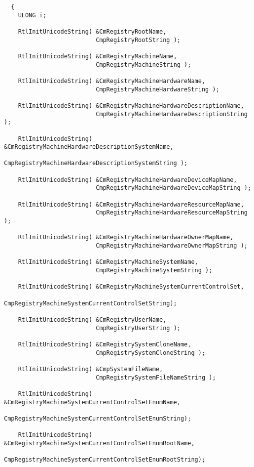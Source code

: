 \begin{listing}
  \begin{verbatim}
  {
    ULONG i;

    RtlInitUnicodeString( &CmRegistryRootName,
                          CmpRegistryRootString );

    RtlInitUnicodeString( &CmRegistryMachineName,
                          CmpRegistryMachineString );

    RtlInitUnicodeString( &CmRegistryMachineHardwareName,
                          CmpRegistryMachineHardwareString );

    RtlInitUnicodeString( &CmRegistryMachineHardwareDescriptionName,
                          CmpRegistryMachineHardwareDescriptionString );

    RtlInitUnicodeString( &CmRegistryMachineHardwareDescriptionSystemName,
                          CmpRegistryMachineHardwareDescriptionSystemString );

    RtlInitUnicodeString( &CmRegistryMachineHardwareDeviceMapName,
                          CmpRegistryMachineHardwareDeviceMapString );

    RtlInitUnicodeString( &CmRegistryMachineHardwareResourceMapName,
                          CmpRegistryMachineHardwareResourceMapString );

    RtlInitUnicodeString( &CmRegistryMachineHardwareOwnerMapName,
                          CmpRegistryMachineHardwareOwnerMapString );

    RtlInitUnicodeString( &CmRegistryMachineSystemName,
                          CmpRegistryMachineSystemString );

    RtlInitUnicodeString( &CmRegistryMachineSystemCurrentControlSet,
                          CmpRegistryMachineSystemCurrentControlSetString);

    RtlInitUnicodeString( &CmRegistryUserName,
                          CmpRegistryUserString );

    RtlInitUnicodeString( &CmRegistrySystemCloneName,
                          CmpRegistrySystemCloneString );

    RtlInitUnicodeString( &CmpSystemFileName,
                          CmpRegistrySystemFileNameString );

    RtlInitUnicodeString( &CmRegistryMachineSystemCurrentControlSetEnumName,
                          CmpRegistryMachineSystemCurrentControlSetEnumString);

    RtlInitUnicodeString( &CmRegistryMachineSystemCurrentControlSetEnumRootName,
                          CmpRegistryMachineSystemCurrentControlSetEnumRootString);


\end{verbatim}
\end{listing}
